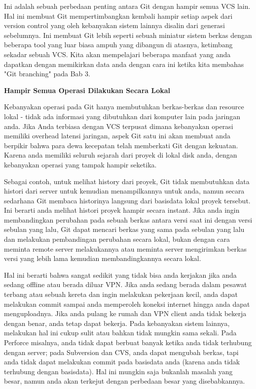 \documentclass[12pt,a4paper]{article}
\begin{document}
Ini adalah sebuah perbedaan penting antara Git dengan hampir semua VCS 
lain. Hal ini membuat Git mempertimbangkan kembali hampir setiap aspek 
dari version control yang oleh kebanyakan sistem lainnya disalin dari 
generasi sebelumnya. Ini membuat Git lebih seperti sebuah miniatur 
sistem berkas dengan beberapa tool yang luar biasa ampuh yang dibangun 
di atasnya, ketimbang sekadar sebuah VCS. Kita akan mempelajari beberapa 
manfaat yang anda dapatkan dengan memikirkan data anda dengan cara ini 
ketika kita membahas "Git branching" pada Bab 3.\vspace{12pt}

\textbf{Hampir Semua Operasi Dilakukan Secara Lokal}\vspace{12pt}

Kebanyakan operasi pada Git hanya membutuhkan berkas-berkas dan resource 
lokal - tidak ada informasi yang dibutuhkan dari komputer lain pada 
jaringan anda. Jika Anda terbiasa dengan VCS terpusat dimana kebanyakan 
operasi memiliki overhead latensi jaringan, aspek Git satu ini akan 
membuat anda berpikir bahwa para dewa kecepatan telah memberkati Git 
dengan kekuatan. Karena anda memiliki seluruh sejarah dari proyek di 
lokal disk anda, dengan kebanyakan operasi yang tampak hampir seketika.\vspace{12pt}

Sebagai contoh, untuk melihat history dari proyek, Git tidak membutuhkan 
data histori dari server untuk kemudian menampilkannya untuk anda, namun 
secara sedarhana Git membaca historinya langsung dari basisdata lokal 
proyek tersebut. Ini berarti anda melihat histori proyek hampir secara 
instant. Jika anda ingin membandingkan perubahan pada sebuah berkas 
antara versi saat ini dengan versi sebulan yang lalu, Git dapat mencari 
berkas yang sama pada sebulan yang lalu dan melakukan pembandingan 
perubahan secara lokal, bukan dengan cara meminta remote server 
melakukannya atau meminta server mengirimkan berkas versi yang lebih 
lama kemudian membandingkannya secara lokal.\vspace{12pt}

Hal ini berarti bahwa sangat sedikit yang tidak bisa anda kerjakan jika 
anda sedang offline atau berada diluar VPN. Jika anda sedang berada 
dalam pesawat terbang atau sebuah kereta dan ingin melakukan pekerjaan 
kecil, anda dapat melakukan commit sampai anda memperoleh koneksi 
internet hingga anda dapat menguploadnya. Jika anda pulang ke rumah dan 
VPN client anda tidak bekerja dengan benar, anda tetap dapat bekerja. 
Pada kebanyakan sistem lainnya, melakukan hal ini cukup sulit atau 
bahkan tidak mungkin sama sekali. Pada Perforce misalnya, anda tidak 
dapat berbuat banyak ketika anda tidak terhubung dengan server; pada 
Subversion dan CVS, anda dapat mengubah berkas, tapi anda tidak dapat 
melakukan commit pada basisdata anda (karena anda tidak terhubung dengan 
basisdata). Hal ini mungkin saja bukanlah masalah yang besar, namun anda 
akan terkejut dengan perbedaan besar yang disebabkannya.\vspace{12pt}
\end{document}
